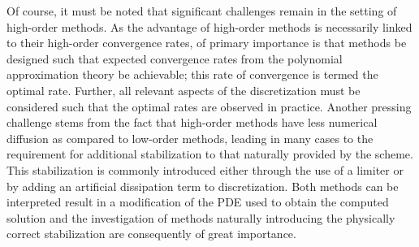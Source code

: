 Of course, it must be noted that significant challenges remain in the setting of
high-order methods.
As the advantage of high-order methods is necessarily linked to their
high-order convergence rates, of primary importance is that methods be
designed such that expected convergence rates from the polynomial approximation
theory be achievable; this rate of convergence is termed the optimal rate.
Further, all relevant aspects of the discretization must be
considered such that the optimal rates are observed in practice.
Another pressing challenge stems from the fact that high-order methods have less
numerical diffusion as compared to low-order methods, leading in many cases to
the requirement for additional stabilization to that naturally provided by
the scheme.
This stabilization is commonly introduced either through
the use of a limiter or by adding an artificial dissipation term to
discretization.
Both methods can be interpreted result in a modification of the PDE used to
obtain the computed solution and the investigation of methods naturally
introducing the physically correct stabilization are consequently of great
importance.
